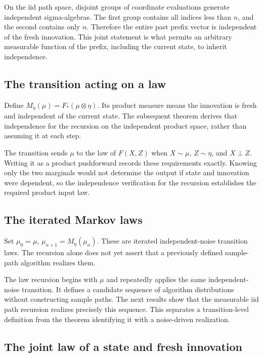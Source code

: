 \documentclass[11pt,a4paper]{article}
\begin{document}
On the iid path space, disjoint groups of coordinate evaluations generate independent sigma-algebras. The first group contains all indices less than \(n\), and the second contains only \(n\). Therefore the entire past prefix vector is independent of the fresh innovation. This joint statement is what permits an arbitrary measurable function of the prefix, including the current state, to inherit independence.


\subsection{\texorpdfstring{The transition acting on a law}{The transition acting on a law}}


Define \(M_\eta(\mu)=F_*(\mu\otimes\eta)\). Its product measure means the innovation is fresh and independent of the current state. The subsequent theorem derives that independence for the recursion on the independent product space, rather than assuming it at each step.



The transition sends \(\mu\) to the law of \(F(X,Z)\) when \(X\sim\mu\), \(Z\sim\eta\), and \(X\perp Z\). Writing it as a product pushforward records these requirements exactly. Knowing only the two marginals would not determine the output if state and innovation were dependent, so the independence verification for the recursion establishes the required product input law.


\subsection{\texorpdfstring{The iterated Markov laws}{The iterated Markov laws}}


Set \(\mu_0=\mu\), \(\mu_{n+1}=M_\eta(\mu_n)\). These are iterated independent-noise transition laws. The recursion alone does not yet assert that a previously defined sample-path algorithm realizes them.



The law recursion begins with \(\mu\) and repeatedly applies the same independent-noise transition. It defines a candidate sequence of algorithm distributions without constructing sample paths. The next results show that the measurable iid path recursion realizes precisely this sequence. This separates a transition-level definition from the theorem identifying it with a noise-driven realization.


\subsection{\texorpdfstring{The joint law of a state and fresh innovation}{The joint law of a state and fresh innovation}}
\end{document}
